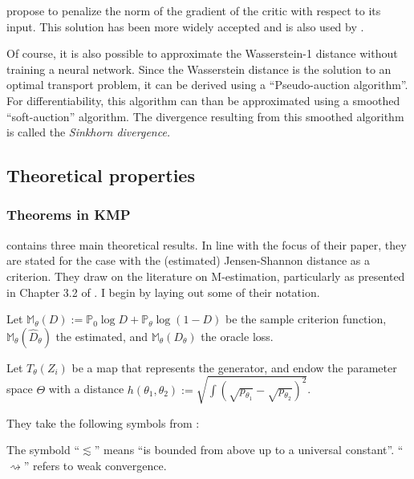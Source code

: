 \Textcite{gulrajani2017improvedtrainingwassersteingans} propose to penalize the norm of the gradient of the critic with respect to its input.
This solution has been more widely accepted and is also used by \textcite{athey2021using}.

Of course, it is also possible to approximate the Wasserstein-1 distance without training a neural network.
Since the Wasserstein distance is the solution to an optimal transport problem, it can be derived using a ``Pseudo-auction algorithm''.
For differentiability, this algorithm can than be approximated using a smoothed ``soft-auction'' algorithm.
The divergence resulting from this smoothed algorithm is called the \textit{Sinkhorn divergence.} %

\subsection{Theoretical properties}
\label{sec:theory}

\subsubsection{Theorems in KMP}
\label{sec:theorems_paper}

\textcite{kaji2023adversarial} contains three main theoretical results.
In line with the focus of their paper, they are stated for the case with the (estimated) Jensen-Shannon distance as a criterion.
They draw on the literature on M-estimation, particularly as presented in Chapter 3.2 of \textcite{vanderVaart2023}. %
I begin by laying out some of their notation.

Let $\mathbb{M}_{\theta}(D):=\mathbb{P}_{0} \log D+\mathbb{P}_{\theta} \log (1-D)$ be the sample criterion function, 
$\mathbb{M}_{\theta}\left(\hat{D}_{\theta}\right)$ the estimated, and 
$\mathbb{M}_{\theta}\left(D_{\theta}\right)$ the oracle loss.

Let $T_{\theta}(Z_i)$ be a map that represents the generator,
and endow the parameter space $\Theta$ with a distance $h\left(\theta_{1}, \theta_{2}\right):=\sqrt{\int\left(\sqrt{p_{\theta_{1}}}-\sqrt{p_{\theta_{2}}}\right)^{2}}$.

They take the following symbols from \textcite{vanderVaart2023}:

The symbold ``$\lesssim$'' means ``is bounded from above up to a universal constant''.
``$\rightsquigarrow$'' refers to weak convergence.%


